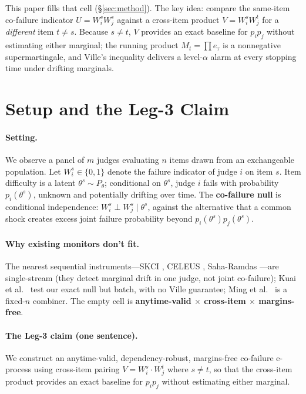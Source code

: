 \documentclass{article}
\begin{document}
This paper fills that cell (\S\ref{sec:method}). The key idea: compare the
same-item co-failure indicator $U=W_i^s W_j^s$ against a cross-item product
$V=W_i^s W_j^t$ for a \emph{different} item $t \ne s$. Because $s\ne t$, $V$
provides an exact baseline for $p_i p_j$ without estimating either marginal;
the running product $M_t=\prod e_\tau$ is a nonnegative supermartingale, and
Ville's inequality \citep{ville1939} delivers a level-$\alpha$ alarm at every
stopping time under drifting marginals.

\section{Setup and the Leg-3 Claim}
\label{sec:setup}

\paragraph{Setting.}
We observe a panel of $m$ judges evaluating $n$ items drawn from an exchangeable
population. Let $W_i^s \in \{0,1\}$ denote the failure indicator of judge $i$ on
item $s$. Item difficulty is a latent $\theta^s \sim P_\theta$; conditional on
$\theta^s$, judge $i$ fails with probability $p_i(\theta^s)$, unknown and
potentially drifting over time. The \textbf{co-failure null} is conditional
independence: $W_i^s \perp W_j^s \mid \theta^s$, against the alternative that a
common shock creates excess joint failure probability beyond $p_i(\theta^s)
p_j(\theta^s)$.

\paragraph{Why existing monitors don't fit.}
The nearest sequential instruments---SKCI \citep{he2606}, CELEUS
\citep{celeus2606}, Saha-Ramdas \citep{saharamdas2607}---are single-stream (they
detect marginal drift in one judge, not joint co-failure); Kuai et al.\
\citep{kuai2604} test our exact null but batch, with no Ville guarantee; Ming et
al.\ \citep{ming2603} is a fixed-$n$ combiner. The empty cell is
\textbf{anytime-valid $\times$ cross-item $\times$ margins-free}.

\paragraph{The Leg-3 claim (one sentence).}
We construct an anytime-valid, dependency-robust, margins-free co-failure
e-process using cross-item pairing $V = W_i^s \cdot W_j^t$ where $s \ne t$, so
that the cross-item product provides an exact baseline for $p_i p_j$ without
estimating either marginal.
\end{document}
